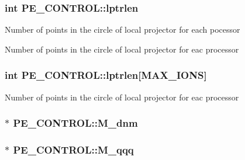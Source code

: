 \hypertarget{struct_p_e___c_o_n_t_r_o_l_aff7d68a81c3ff9ab07e62a3649ffd16a}{
\subsubsection[{lptrlen}]{\setlength{\rightskip}{0pt plus 5cm}int P\-E\-\_\-\-C\-O\-N\-T\-R\-O\-L\-::lptrlen}}\label{struct_p_e___c_o_n_t_r_o_l_aff7d68a81c3ff9ab07e62a3649ffd16a}
Number of points in the circle of local projector for each pocessor

Number of points in the circle of local projector for eac processor \hypertarget{struct_p_e___c_o_n_t_r_o_l_a2bf99672f1ab3402a8bbfdf1f6df06e8}{
\subsubsection[{lptrlen}]{\setlength{\rightskip}{0pt plus 5cm}int P\-E\-\_\-\-C\-O\-N\-T\-R\-O\-L\-::lptrlen\mbox{[}{\bf M\-A\-X\-\_\-\-I\-O\-N\-S}\mbox{]}}}\label{struct_p_e___c_o_n_t_r_o_l_a2bf99672f1ab3402a8bbfdf1f6df06e8}
Number of points in the circle of local projector for eac processor \hypertarget{struct_p_e___c_o_n_t_r_o_l_a0ae1a5f47b9e74db9e9ad0dcb90da192}{
\subsubsection[{M\-\_\-dnm}]{$\ast$ P\-E\-\_\-\-C\-O\-N\-T\-R\-O\-L\-::\-M\-\_\-dnm}}\label{struct_p_e___c_o_n_t_r_o_l_a0ae1a5f47b9e74db9e9ad0dcb90da192}
\hypertarget{struct_p_e___c_o_n_t_r_o_l_a07249427b67ca679ee83ea81078ec632}{
\subsubsection[{M\-\_\-qqq}]{$\ast$ P\-E\-\_\-\-C\-O\-N\-T\-R\-O\-L\-::\-M\-\_\-qqq}}\label{struct_p_e___c_o_n_t_r_o_l_a07249427b67ca679ee83ea81078ec632}
